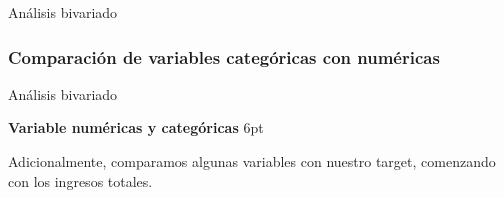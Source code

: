 \documentclass[pdf]{beamer}
\def\vspace{}%
\begin{document}
{\begin{frame}{Análisis bivariado}
\end{frame}
 
    \subsubsection{Comparación de variables categóricas con numéricas}

\begin{frame}{Análisis bivariado}

    \textbf{Variable numéricas y categóricas}
    \vspace{6pt}

    Adicionalmente, comparamos algunas variables con nuestro target, comenzando con los ingresos totales.






 
 
 


\end{frame}}
\end{document}
